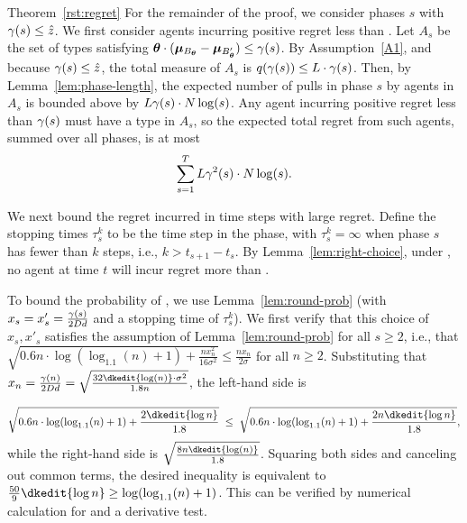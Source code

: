 \begin{emptyextraproof}{Theorem~\ref{rst:regret}}
For the remainder of the proof, we consider phases $s$
with $\EarlyCut{s} \leq \TieCutoff$.
We first consider agents \AgV incurring positive regret less than .
Let $A_s$ be the set of types satisfying 
$\AgV \cdot (\ArmV{\Best{\AgV}} - \ArmV{\Second{\AgV}}) \leq \EarlyCut{s}$.
By Assumption~\ref{A1}, and because $\EarlyCut{s} \leq \TieCutoff$,
the total measure of $A_s$
is $\AlmostTied{\EarlyCut{s}} \leq \TieDensity \cdot \EarlyCut{s}$.
Then, by Lemma~\ref{lem:phase-length},
the expected number of pulls in phase $s$ by agents in $A_s$  
is bounded above by $\TieDensity \EarlyCut{s} \cdot \ARMNUM \log(s)$.
Any agent \AgV incurring positive regret less than $\EarlyCut{s}$
must have a type in $A_s$,
so the expected total regret from such agents,
summed over all phases, is at most
\begin{equation}
\sum_{s=1}^{T} \TieDensity \EarlyCut[2]{s} \cdot \ARMNUM \log(s).
\label{equ:small_regret_bound}
\end{equation}

We next bound the regret incurred in time steps with large regret.
Define the stopping times $\tau_{s}^{k}$ to be the 
time step in the  phase,
with $\tau_{s}^{k} = \infty$ when phase $s$ has fewer than $k$ steps,
i.e., $k > t_{s+1}-t_{s}$.
By Lemma~\ref{lem:right-choice},
under ,
no agent at time $t$ will incur regret more than .
  
To bound the probability of ,
we use Lemma~\ref{lem:round-prob}
(with $x_s = x'_s = \frac{\EarlyCut{s}}{2 \Diam d}$
and a stopping time of $\tau_s^k$).
We first verify that this choice of $x_s, x'_s$
satisfies the assumption of Lemma~\ref{lem:round-prob} for all
$s \geq 2$,
i.e., that
$\sqrt{0.6 n \cdot \log (\log_{1.1}(n) + 1) + \frac{n x_n^2}{16 \sigma^2}}
\leq \frac{n x_n}{2 \sigma}$
for all $n \geq 2$.
Substituting that
$x_n = \frac{\EarlyCut{n}}{2 \Diam d} = \sqrt{\frac{32\dkedit{\log(n)} \cdot \sigma^2}{1.8 n}}$,
the left-hand side is

\[
  \sqrt{0.6 n \cdot \log (\log_{1.1}(n) + 1) + \frac{2 \dkedit{\log n}}{1.8}}
  \; \leq \;
  \sqrt{0.6 n \cdot \log (\log_{1.1}(n) + 1) + \frac{2 n \dkedit{\log n}}{1.8}},
\]
while the right-hand side is $\sqrt{\frac{8 n \dkedit{\log(n)}}{1.8}}$.
Squaring both sides and canceling out common terms,
the desired inequality is equivalent to
$\frac{50}{9} \dkedit{\log n} \geq \log(\log_{1.1}(n) + 1)$.
This can be verified by numerical calculation for  and a
derivative test.


\end{emptyextraproof}
